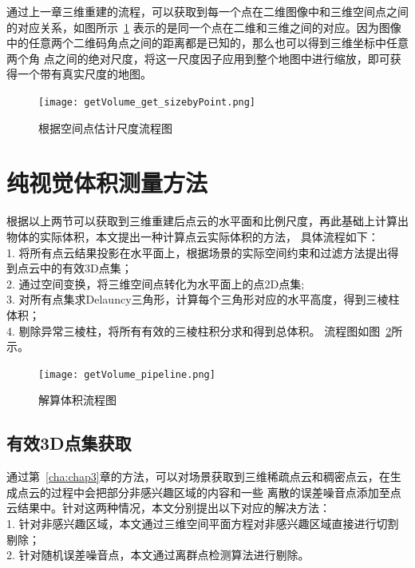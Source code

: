 通过上一章三维重建的流程，可以获取到每一个点在二维图像中和三维空间点之间的对应关系，如图所示~\ref{fig:getVolume_get_sizebyPoint}
表示的是同一个点在二维和三维之间的对应。因为图像中的任意两个二维码角点之间的距离都是已知的，那么也可以得到三维坐标中任意两个角
点之间的绝对尺度，将这一尺度因子应用到整个地图中进行缩放，即可获得一个带有真实尺度的地图。
\begin{figure}[H] %
  \centering
  \texttt{[image: getVolume\_get\_sizebyPoint.png]}
  \caption{根据空间点估计尺度流程图}
  \label{fig:getVolume_get_sizebyPoint}
\end{figure}
\section{纯视觉体积测量方法}
\label{sec:4.4}
根据以上两节可以获取到三维重建后点云的水平面和比例尺度，再此基础上计算出物体的实际体积，本文提出一种计算点云实际体积的方法，
具体流程如下：\\
1.	将所有点云结果投影在水平面上，根据场景的实际空间约束和过滤方法提出得到点云中的有效3D点集；\\
2.	通过空间变换，将三维空间点转化为水平面上的点2D点集;\\
3.	对所有点集求Delauncy三角形，计算每个三角形对应的水平高度，得到三棱柱体积；\\
4.	剔除异常三棱柱，将所有有效的三棱柱积分求和得到总体积。
流程图如图~\ref{fig:getVolume_pipeline}所示。
\begin{figure}[H] %
  \centering
  \texttt{[image: getVolume\_pipeline.png]}
  \caption{解算体积流程图}
  \label{fig:getVolume_pipeline}
\end{figure}
\subsection{有效3D点集获取}
\label{sec:4.4.1}
通过第~\ref{cha:chap3}章的方法，可以对场景获取到三维稀疏点云和稠密点云，在生成点云的过程中会把部分非感兴趣区域的内容和一些
离散的误差噪音点添加至点云结果中。针对这两种情况，本文分别提出以下对应的解决方法：\\
1.	针对非感兴趣区域，本文通过三维空间平面方程对非感兴趣区域直接进行切割剔除；\\
2.	针对随机误差噪音点，本文通过离群点检测算法进行剔除。

